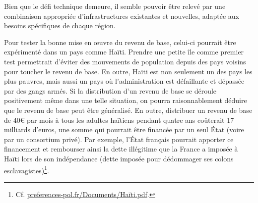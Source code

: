 \documentclass[a5paper,french]{memoir}
\begin{document}
Bien que le défi technique demeure, il semble pouvoir être relevé par une combinaison appropriée d'infrastructures existantes et nouvelles, adaptée aux besoins spécifiques de chaque région. 

Pour tester la bonne mise en œuvre du revenu de base, celui-ci pourrait être expérimenté dans un pays comme Haïti. Prendre une petite île comme premier test permettrait d'éviter des mouvements de population depuis des pays voisins pour toucher le revenu de base. En outre, Haïti est non seulement un des pays les plus pauvres, mais aussi un pays où l'administration est défaillante et dépassée par des gangs armés. Si la distribution d'un revenu de base se déroule positivement même dans une telle situation, on pourra raisonnablement déduire que le revenu de base peut être généralisé. En outre, distribuer un revenu de base de 40\euro{} par mois à tous les adultes haïtiens pendant quatre ans coûterait 17 milliards d'euros, une somme qui pourrait être financée par un seul État (voire par un consortium privé). %
Par exemple, l'État français pourrait apporter ce financement et rembourser ainsi la dette illégitime que la France a imposée à Haïti lors de son indépendance (dette imposée pour dédommager ses colons esclavagistes)\footnote{Cf. \href{http://preferences-pol.fr/Documents/Haïti.pdf}{preferences-pol.fr/Documents/Haïti.pdf}.}.


\end{document}
